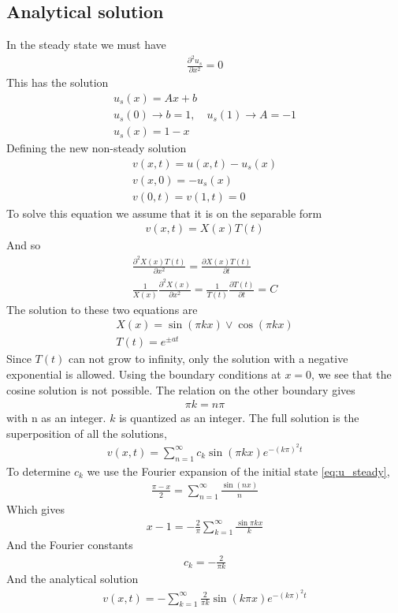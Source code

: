 \documentclass[11pt,a4paper,draft]{article}
\numberwithin{equation}{section}
\begin{document}
\subsection{Analytical solution}
In the steady state we must have
\begin{gather}
\frac{\partial^2 u_s}{\partial x^2} = 0
\end{gather}
This has the solution
\begin{gather}
u_s(x) = Ax + b\\
u_s(0) \to b = 1, \quad
u_s(1) \to A = -1\\
u_s(x) = 1-x \label{eq:u_steady}
\end{gather}
Defining the new non-steady solution
\begin{gather}
v(x,t) = u(x,t) - u_s(x)\\
v(x,0) = -u_s(x)\\
v(0,t) = v(1, t) = 0
\end{gather}
To solve this equation we assume that it is on the separable form
\begin{gather}
v(x,t) = X(x)T(t)
\end{gather}
And so
\begin{gather}
\frac{\partial^2 X(x)T(t)}{\partial x^2}
= \frac{\partial X(x)T(t)}{\partial t}\\
\frac{1}{X(x)}\frac{\partial^2 X(x)}{\partial x^2}
 = \frac{1}{T(t)}\frac{\partial T(t)}{\partial t} = C
 \label{eq:coupled_constant}
\end{gather}
The solution to these two equations are 
\begin{gather}
X(x) = \sin(\pi kx) \lor \cos(\pi kx)\\
T(t) = e^{\pm at}
\end{gather}
Since $T(t)$ can not grow to infinity, only the solution with a 
negative exponential is allowed. Using the boundary conditions at 
$x=0$, we see that the cosine solution is not possible.
The relation on the other boundary gives 
\begin{gather}
\pi k = n\pi
\end{gather}
with n as an integer. $k$ is quantized as an integer. The full solution 
is the superposition of all the solutions,
\begin{gather}
v(x,t) = \sum_{n=1}^\infty c_k \sin(\pi kx)e^{-(k\pi)^2t}
\end{gather}
To determine $c_k$ we use the Fourier expansion of the initial 
state \eqref{eq:u_steady}, 
\begin{gather}
\frac{\pi - x}{2} = \sum_{n=1}^\infty \frac{\sin(nx)}{n}
\end{gather}
Which gives
\begin{gather}
x-1 = -\frac{2}{\pi}\sum_{k=1}^\infty \frac{\sin\pi kx}{k}
\end{gather}
And the Fourier constants
\begin{gather}
c_k = -\frac{2}{\pi k}
\end{gather}
And the analytical solution
\begin{gather}
v(x,t) = -\sum_{k=1}^\infty \frac{2}{\pi k}\sin(k\pi x)e^{-(k\pi)^2t}
\end{gather}
\end{document}
